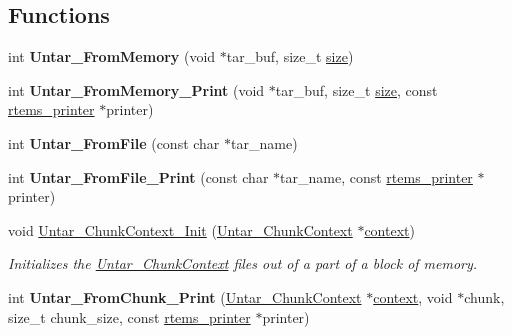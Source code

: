 \subsection*{Functions}
\begin{DoxyCompactItemize}
\item 
\mbox{\label{group__libmisc__untar__img_gaf0495981700b3d5dbb2b00b6183bbf94}} 
int {\bfseries Untar\+\_\+\+From\+Memory} (void $\ast$tar\+\_\+buf, size\+\_\+t \mbox{\hyperlink{sun4u_2tte_8h_a245260f6f74972558f61b85227df5aae}{size}})
\item 
\mbox{\label{group__libmisc__untar__img_gaa1f6ef47bd896c6caa14161c594cc4e0}} 
int {\bfseries Untar\+\_\+\+From\+Memory\+\_\+\+Print} (void $\ast$tar\+\_\+buf, size\+\_\+t \mbox{\hyperlink{sun4u_2tte_8h_a245260f6f74972558f61b85227df5aae}{size}}, const \mbox{\hyperlink{structrtems__printer}{rtems\+\_\+printer}} $\ast$printer)
\item 
\mbox{\label{group__libmisc__untar__img_ga79e6e0abb34028e1adffb163c4517196}} 
int {\bfseries Untar\+\_\+\+From\+File} (const char $\ast$tar\+\_\+name)
\item 
\mbox{\label{group__libmisc__untar__img_ga9dd2f31a3b29a825c133549f4d2230f7}} 
int {\bfseries Untar\+\_\+\+From\+File\+\_\+\+Print} (const char $\ast$tar\+\_\+name, const \mbox{\hyperlink{structrtems__printer}{rtems\+\_\+printer}} $\ast$printer)
\item 
void \mbox{\hyperlink{group__libmisc__untar__img_gadfe0cdaf37c2939553e5babf3b76c6b1}{Untar\+\_\+\+Chunk\+Context\+\_\+\+Init}} (\mbox{\hyperlink{structUntar__ChunkContext}{Untar\+\_\+\+Chunk\+Context}} $\ast$\mbox{\hyperlink{sun4u_2tte_8h_a9b4a99475e2709333b8e5d70483173f1}{context}})
\begin{DoxyCompactList}\small\item\em Initializes the \mbox{\hyperlink{structUntar__ChunkContext}{Untar\+\_\+\+Chunk\+Context}} files out of a part of a block of memory. \end{DoxyCompactList}\item 
\mbox{\label{group__libmisc__untar__img_ga0972c19b126c1d8e6503ce0feeb09746}} 
int {\bfseries Untar\+\_\+\+From\+Chunk\+\_\+\+Print} (\mbox{\hyperlink{structUntar__ChunkContext}{Untar\+\_\+\+Chunk\+Context}} $\ast$\mbox{\hyperlink{sun4u_2tte_8h_a9b4a99475e2709333b8e5d70483173f1}{context}}, void $\ast$chunk, size\+\_\+t chunk\+\_\+size, const \mbox{\hyperlink{structrtems__printer}{rtems\+\_\+printer}} $\ast$printer)

\end{DoxyCompactItemize}
